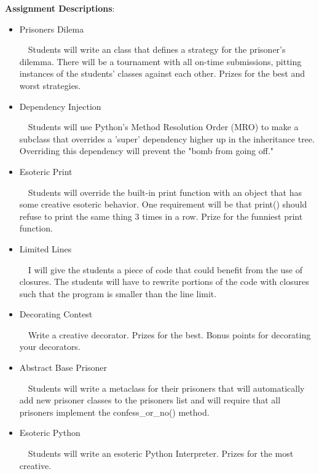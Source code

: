 \documentclass[11pt]{article}
\begin{document}
\vspace{10mm}

\textbf {\large Assignment Descriptions}:

\begin{itemize} 

\item Prisoners Dilema 

$\ \ \ $ Students will write an class that defines a strategy for the prisoner's dilemma. There will be a tournament with all on-time submissions, pitting instances of the students' classes against each other. Prizes for the best and worst strategies.

\item Dependency Injection 

$\ \ \ $ Students will use Python's Method Resolution Order (MRO) to make a subclass that overrides a 'super' dependency higher up in the inheritance tree. Overriding this dependency will prevent the "bomb from going off."

\item Esoteric Print 

$\ \ \ $ Students will override the built-in print function with an object that has some creative esoteric behavior. One requirement will be that print() should refuse to print the same thing 3 times in a row. Prize for the funniest print function.

\item Limited Lines

$\ \ \ $ I will give the students a piece of code that could benefit from the use of closures. The students will have to rewrite portions of the code with closures such that the program is smaller than the line limit.

\item Decorating Contest

$\ \ \ $ Write a creative decorator. Prizes for the best. Bonus points for decorating your decorators.

\item Abstract Base Prisoner

$\ \ \ $ Students will write a metaclass for their prisoners that will automatically add new prisoner classes to the prisoners list and will require that all prisoners implement the confess\_or\_no() method.

\item Esoteric Python 

$\ \ \ $ Students will write an esoteric Python Interpreter. Prizes for the most creative.


\end{itemize}
\end{document}

